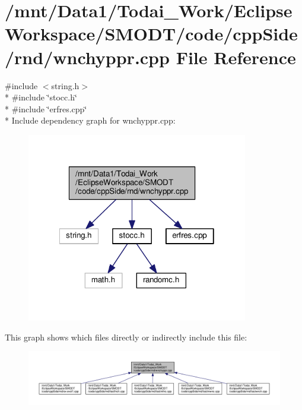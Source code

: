 \section{/mnt/\-Data1/\-Todai\-\_\-\-Work/\-Eclipse\-Workspace/\-S\-M\-O\-D\-T/code/cpp\-Side/rnd/wnchyppr.cpp File Reference}
\label{rnd_2wnchyppr_8cpp}
{\ttfamily \#include $<$string.\-h$>$}\\*
{\ttfamily \#include \char`\"{}stocc.\-h\char`\"{}}\\*
{\ttfamily \#include \char`\"{}erfres.\-cpp\char`\"{}}\\*
Include dependency graph for wnchyppr.\-cpp\-:
\nopagebreak
\begin{figure}[H]
\begin{center}
\leavevmode
\includegraphics[width=274pt]{rnd_2wnchyppr_8cpp__incl}
\end{center}
\end{figure}
This graph shows which files directly or indirectly include this file\-:
\nopagebreak
\begin{figure}[H]
\begin{center}
\leavevmode
\includegraphics[width=350pt]{rnd_2wnchyppr_8cpp__dep__incl}
\end{center}
\end{figure}
